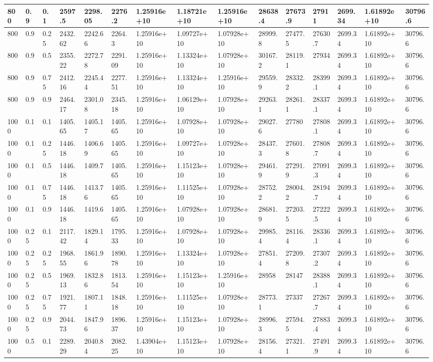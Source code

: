 \begin{table}[!htbp]
\begin{tabularx}{\textwidth}{|p{0.4cm}|*{2}{p{0.2cm}|}*{12}{X|}}
800&0.9&0.1&2597.5&2298.05&2276.2&1.25916e+10&1.18721e+10&1.25916e+10&28638.4&27673.9&27911&2699.34&1.61892e+10&30796.6\\\hline
800&0.9&0.25&2432.62&2242.66&2264.3&1.25916e+10&1.09727e+10&1.07928e+10&28999.8&27477.5&27630.7&2699.34&1.61892e+10&30796.6\\\hline
800&0.9&0.5&2355.22&2272.78&2291.09&1.25916e+10&1.13324e+10&1.07928e+10&30167.2&28119.1&27934&2699.34&1.61892e+10&30796.6\\\hline
800&0.9&0.75&2412.16&2245.44&2277.51&1.25916e+10&1.13324e+10&1.25916e+10&29559.9&28332.2&28399.1&2699.34&1.61892e+10&30796.6\\\hline
800&0.9&0.9&2464.17&2301.08&2345.18&1.25916e+10&1.06129e+10&1.07928e+10&29263.1&28261.1&28337.1&2699.34&1.61892e+10&30796.6\\\hline
1000&0.1&0.1&1405.65&1405.17&1405.65&1.25916e+10&1.07928e+10&1.07928e+10&29027.6&27780&27808.1&2699.34&1.61892e+10&30796.6\\\hline
1000&0.1&0.25&1446.18&1406.69&1405.65&1.25916e+10&1.09727e+10&1.07928e+10&28437.3&27601.8&27808.7&2699.34&1.61892e+10&30796.6\\\hline
1000&0.1&0.5&1446.18&1409.7&1405.65&1.25916e+10&1.15123e+10&1.07928e+10&29461.9&27291.9&27091.3&2699.34&1.61892e+10&30796.6\\\hline
1000&0.1&0.75&1446.18&1413.76&1405.65&1.25916e+10&1.11525e+10&1.07928e+10&28752.2&28004.2&28194.7&2699.34&1.61892e+10&30796.6\\\hline
1000&0.1&0.9&1446.18&1419.6&1405.65&1.25916e+10&1.07928e+10&1.07928e+10&28681.9&27203.5&27222.5&2699.34&1.61892e+10&30796.6\\\hline
1000&0.25&0.1&2117.42&1829.14&1795.33&1.25916e+10&1.07928e+10&1.07928e+10&29985.4&28116.4&28336.1&2699.34&1.61892e+10&30796.6\\\hline
1000&0.25&0.25&1968.55&1861.96&1890.78&1.25916e+10&1.13324e+10&1.07928e+10&27851.4&27209.8&27307.2&2699.34&1.61892e+10&30796.6\\\hline
1000&0.25&0.5&1969.13&1832.86&1813.54&1.25916e+10&1.15123e+10&1.25916e+10&28958&28147&28388.1&2699.34&1.61892e+10&30796.6\\\hline
1000&0.25&0.75&1921.77&1807.11&1848.18&1.25916e+10&1.11525e+10&1.07928e+10&28773.1&27337&27267.7&2699.34&1.61892e+10&30796.6\\\hline
1000&0.25&0.9&2044.73&1847.96&1896.37&1.25916e+10&1.15123e+10&1.07928e+10&28996.3&27594.5&27883.4&2699.34&1.61892e+10&30796.6\\\hline
1000&0.5&0.1&2289.29&2040.84&2082.25&1.43904e+10&1.15123e+10&1.07928e+10&28156.4&27321.1&27491.9&2699.34&1.61892e+10&30796.6\\\hline

\end{tabularx}
\end{table}
